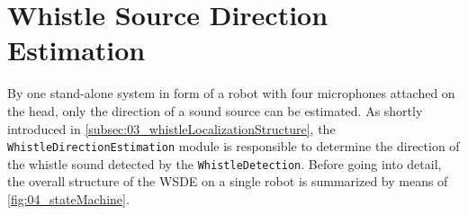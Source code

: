 \section{Whistle Source Direction Estimation}
\label{subsec:03_directionEstimation}

By one stand-alone system in form of a robot with four microphones
attached on the head, only the direction of a sound source can be
estimated.
As shortly introduced in \cref{subsec:03_whistleLocalizationStructure},
the \lstinline!WhistleDirectionEstimation! module is responsible to
determine the direction of the whistle sound detected by the \lstinline!WhistleDetection!.
Before going into detail, the overall structure of the \ac{WSDE} on a single robot
is summarized by means of \cref{fig:04_stateMachine}.

